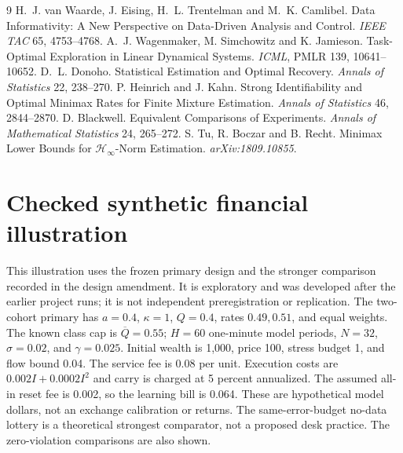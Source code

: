 \documentclass[12pt]{article}
\theoremstyle{definition}
\theoremstyle{remark}
\begin{document}
\begin{thebibliography}{9}\small
{} H.~J. van Waarde, J. Eising,
H.~L. Trentelman and M.~K. Camlibel. Data Informativity: A New Perspective on
Data-Driven Analysis and Control. \emph{IEEE TAC} 65, 4753--4768.
 A.~J. Wagenmaker,
M. Simchowitz and K. Jamieson. Task-Optimal Exploration in Linear Dynamical
Systems. \emph{ICML}, PMLR 139, 10641--10652.
 D.~L. Donoho. Statistical Estimation and
Optimal Recovery. \emph{Annals of Statistics} 22, 238--270.
 P. Heinrich and J. Kahn.
Strong Identifiability and Optimal Minimax Rates for Finite Mixture Estimation.
\emph{Annals of Statistics} 46, 2844--2870.
 D. Blackwell. Equivalent Comparisons
of Experiments. \emph{Annals of Mathematical Statistics} 24, 265--272.
 S. Tu, R. Boczar and B. Recht.
Minimax Lower Bounds for $\mathcal H_\infty$-Norm Estimation.
\emph{arXiv:1809.10855}.
\end{thebibliography}

\section*{Checked synthetic financial illustration}
This illustration uses the frozen primary design and the stronger comparison
recorded in the design amendment. It is exploratory and was developed after
the earlier project runs; it is not independent preregistration or replication.
The two-cohort primary has $a=0.4$, $\kappa=1$, $Q=0.4$, rates
$0.49,0.51$, and equal weights. The known class cap is $\overline Q=0.55$;
$H=60$ one-minute model periods, $N=32$, $\sigma=0.02$, and
$\gamma=0.025$. Initial wealth is 1,000, price 100, stress budget 1,
and flow bound 0.04. The service fee is 0.08 per unit. Execution costs are
$0.002I+0.0002I^2$ and carry is charged at 5 percent annualized.
The assumed all-in reset fee is 0.002, so the learning bill is 0.064.
These are hypothetical model dollars, not an exchange calibration or returns.
The same-error-budget no-data lottery is a theoretical strongest comparator,
not a proposed desk practice. The zero-violation comparisons are also shown.
\end{document}

